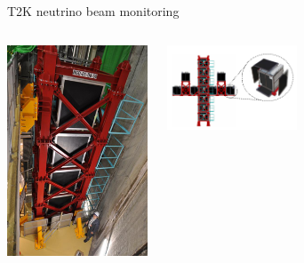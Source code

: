 %
%
\begin{frame}{T2K neutrino beam monitoring}
\begin{columns}
  \begin{column}{0.35\textwidth}
     \includegraphics[width=0.99\textwidth]{./images/3nu/accelerator/t2k/INGRID_picture_1.jpg}
  \end{column}
  \begin{column}{0.65\textwidth}
     \includegraphics[width=0.45\textwidth]{./images/3nu/accelerator/t2k/INGRID_schematic_3.png}

\end{column}
\end{columns}
\end{frame}
